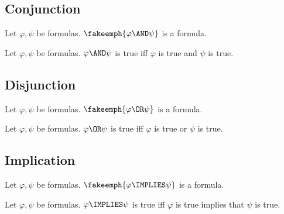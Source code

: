 \documentclass{stex}
\begin{document}
\subsection{Conjunction}\label{sec:conjunction}

\begin{sparagraph}[style=symdoc,for=AND]
  \begin{signature*}
    Let $\varphi, \psi$ be formulas.
    $\fakeemph{\varphi \AND \psi}$ is a formula.
  \end{signature*}

  \begin{axiom*}
    Let $\varphi, \psi$ be formulas.
    $\varphi \AND \psi$ is true iff $\varphi$ is true and $\psi$ is true.
  \end{axiom*}
\end{sparagraph}


\subsection{Disjunction}\label{sec:disjunction}

\begin{sparagraph}[style=symdoc,for=OR]
  \begin{signature*}
    Let $\varphi, \psi$ be formulas.
    $\fakeemph{\varphi \OR \psi}$ is a formula.
  \end{signature*}

  \begin{axiom*}
    Let $\varphi, \psi$ be formulas.
    $\varphi \OR \psi$ is true iff $\varphi$ is true or $\psi$ is true.
  \end{axiom*}
\end{sparagraph}


\subsection{Implication}\label{sec:implication}

\begin{sparagraph}[style=symdoc,for=IMPLIES]
  \begin{signature*}
    Let $\varphi, \psi$ be formulas.
    $\fakeemph{\varphi \IMPLIES \psi}$ is a formula.
  \end{signature*}

  \begin{axiom*}
    Let $\varphi, \psi$ be formulas.
    $\varphi \IMPLIES \psi$ is true iff $\varphi$ is true implies that $\psi$ is true.
  \end{axiom*}
\end{sparagraph}
\end{document}
